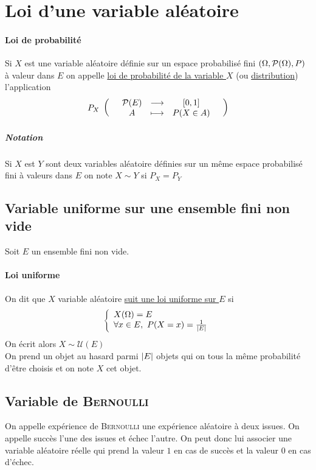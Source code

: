 	\section{Loi d'une variable aléatoire}
		\traitd
		\paragraph{Loi de probabilité}
			Si $X$ est une variable aléatoire définie sur un espace probabilisé fini $(\Omega,\Part(\Omega),P)$ à valeur dans $E$ on appelle \uline{loi de probabilité de la variable $X$} (ou \uline{distribution}) l'application 
			\[ P_X ~ \appli{\Part(E) }{A}{[0,1]}{P(X\in A)} \] \trait
		\subparagraph{Notation}Si $X$ est $Y$ sont deux variables aléatoire définies sur un même espace probabilisé fini à valeurs dans $E$ on note $X\sim Y$ si $P_X=P_Y$
		\vspace*{0.5cm} \\ 
	\subsection{Variable uniforme sur une ensemble fini non vide}
		Soit $E$ un ensemble fini non vide.
		\traitd
		\paragraph{Loi uniforme}
			On dit que $X$ variable aléatoire \uline{suit une loi uniforme sur $E$} si 
			\[ \left\{ \ard X(\Omega) = E \\ \forall x\in E,~P(X=x)= \frac{1}{\abs{E}} \arf \right.\]
			On écrit alors $X\sim \mathcal{U}(E)$ \trait
		\vspace*{-1.1cm} \\ On prend un objet au hasard parmi $\abs{E}$ objets qui on tous la même probabilité d'être choisis et on note $X$ cet objet.
	\subsection{Variable de \textsc{Bernoulli}}
		On appelle expérience de \textsc{Bernoulli} une expérience aléatoire à deux issues. On appelle succès l'une des issues et échec l'autre. On peut donc lui associer une variable aléatoire réelle qui prend la valeur $1$ en cas de succès et la valeur $0$ en cas d'échec. \\ \traitd
